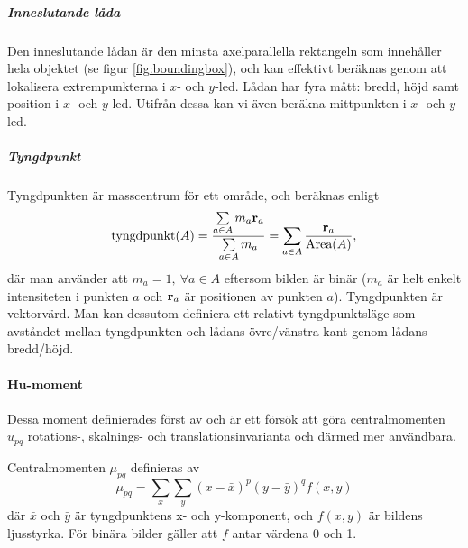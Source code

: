 \documentclass[../rapport_MVEX01-11-05]{subfiles}
\begin{document}
\subparagraph{Inneslutande låda}

Den inneslutande lådan är den minsta axelparallella rektangeln som innehåller hela
objektet (se figur \vref{fig:boundingbox}),
och kan effektivt beräknas genom att lokalisera
extrempunkterna i $x$- och $y$-led. Lådan har fyra mått: bredd, höjd samt
position i $x$- och $y$-led. Utifrån dessa kan vi även beräkna
mittpunkten i $x$- och $y$-led.

\subparagraph{Tyngdpunkt}

Tyngdpunkten är masscentrum för ett område, och beräknas enligt
\begin{equation*}
  \textrm{tyngdpunkt}(A) = \frac{
    \sum\limits_{a\in A}m_a\mathbf{r}_a
  }{
    \sum\limits_{a\in A}m_a
  } =
  \sum\limits_{a\in
  A}\frac{\mathbf{r}_a}{\textrm{Area}(A)},
\end{equation*}
där man använder att $m_a=1,\:\forall a\in A$ eftersom bilden är
binär ($m_a$ är helt enkelt intensiteten i punkten $a$ och
$\mathbf{r}_a$ är positionen av punkten $a$). Tyngdpunkten är vektorvärd.
Man kan dessutom definiera ett relativt tyngdpunktsläge  som avståndet mellan 
tyngdpunkten och lådans övre/vänstra kant genom lådans bredd/höjd.

\newpage
\paragraph{Hu-moment}

Dessa moment definierades först av  och är ett försök att
göra centralmomenten $u_{pq}$ rotations-, skalnings- och translationsinvarianta och
därmed mer användbara. 

Centralmomenten $\mu_{pq}$ definieras av
\begin{equation*}
	\mu_{pq} = \sum\limits_x\sum\limits_y
	           \left(x-\bar{x}\right)^p
	           \left(y-\bar{y}\right)^q
	           f(x,y)
\end{equation*}
där $\bar{x}$ och $\bar{y}$ är tyngdpunktens x- och y-komponent, och $f(x,y)$ är
bildens ljusstyrka. För binära bilder gäller att
$f$ antar värdena 0 och 1.
\end{document}
